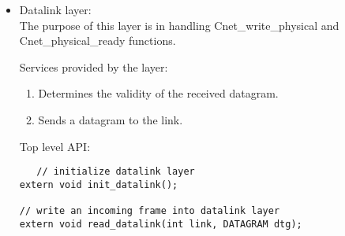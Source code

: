 \documentclass{article}
\begin{document}
\begin{itemize}
\begin{verbatim}
		
\item Network layer: \\
		The purpose of this layer is in routing and discovering network,
		 providing the Transport layer with fragmentation information.
		
		Services provided by the layer:
    \begin{enumerate}
      \item Determines the routing information for a host, by keeping a routing
      table.
      \item Determines lowest MTU on a path from current host to another.
    \end{enumerate}
		
    Top level API:
		
  \begin{verbatim}
    // initialize network layer
    void init_network()	
   		
   // detect a link for outcoming message
extern int get_next_link_for_dest(CnetAddr destaddr);
		
   // detect a link for outcoming message
extern int get_next_link_for_dest(CnetAddr destaddr);

// detect fragmentation size for the specified link
extern int get_mtu_for_link(int link);

// read an incoming packet into network layer
extern void read_network(int link, DATAGRAM dtg);

// write an incoming message from datalink to network layer
extern void write_network(int link, DATAGRAM dtg);
    
  \end{verbatim}
		

\item	Datalink layer: \\
		The purpose of this layer is in handling Cnet\_write\_physical and
		Cnet\_physical\_ready functions. 
		
		Services provided by the layer:
    \begin{enumerate}
      \item Determines the validity of the received datagram.
      \item Sends a datagram to the link.
    \end{enumerate}
		
		Top level API:

  \begin{verbatim}
   // initialize datalink layer
extern void init_datalink();

// write an incoming frame into datalink layer
extern void read_datalink(int link, DATAGRAM dtg);
  \end{verbatim}

\end{itemize}
\end{document}
